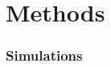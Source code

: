 \documentclass[fleqn,usenatbib]{mnras}
\begin{document}





\section{Methods}
\label{s: methods}

\subsubsection{Simulations}
\label{s: methods -- simulations}
\end{document}
